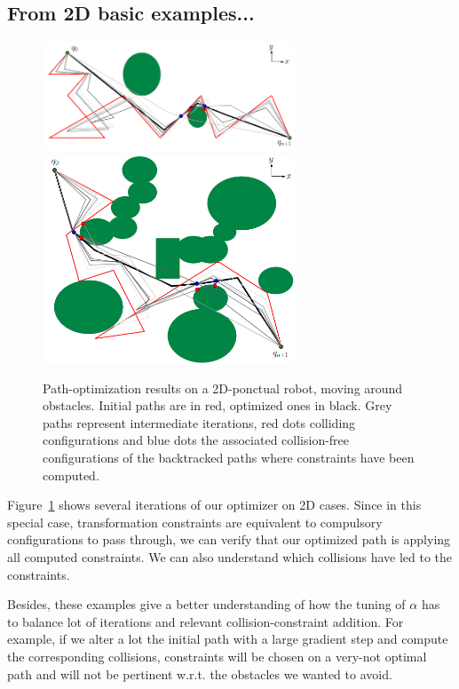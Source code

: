 \documentclass{tADR2e}
\begin{document}
\subsection{From 2D basic examples...}

\begin{figure}[t]
	\centering
	\includegraphics[width=7.5cm]{2d_final_green.png}
	\includegraphics[width=7.5cm]{concave_final_green.png}
	\caption{Path-optimization results on a 2D-ponctual robot, moving around 
	obstacles. Initial paths are in red, optimized ones in black. Grey paths 
	represent intermediate iterations, red dots colliding configurations and blue 
	dots the associated collision-free configurations of the backtracked paths 
	where constraints have been computed.}
	\label{2D_long}
\end{figure}

Figure~\ref{2D_long} shows several iterations of our optimizer on 2D cases. Since 
in this special case, transformation constraints are equivalent to compulsory 
configurations to pass through, we can verify that our optimized path is applying 
all computed constraints. We can also understand which collisions have led to 
the constraints.

Besides, these examples give a better understanding of how the tuning of $\alpha$ 
has to balance lot of iterations and relevant collision-constraint addition. For 
example, if we alter a lot the initial path with a large gradient step and 
compute the corresponding collisions, constraints will be chosen on a very-not 
optimal path and will not be pertinent w.r.t. the obstacles we wanted to 
avoid.
\end{document}
